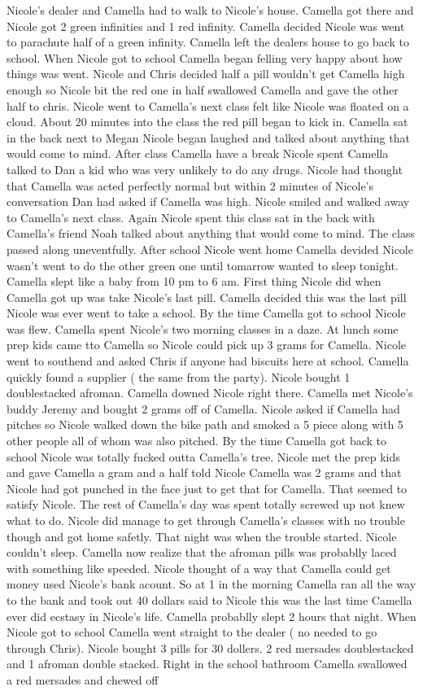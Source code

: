 \documentclass[12pt]{book}
\begin{document}
Nicole's dealer and Camella had to walk to Nicole's house. Camella got there and Nicole got 2 green infinities and 1 red infinity. Camella decided Nicole was went to parachute half of a green infinity. Camella left the dealers house to go back to school. When Nicole got to school Camella began felling very happy about how things was went. Nicole and Chris decided half a pill wouldn't get Camella high enough so Nicole bit the red one in half swallowed Camella and gave the other half to chris. Nicole went to Camella's next class felt like Nicole was floated on a cloud. About 20 minutes into the class the red pill began to kick in. Camella sat in the back next to Megan Nicole began laughed and talked about anything that would come to mind. After class Camella have a break Nicole spent Camella talked to Dan a kid who was very unlikely to do any drugs. Nicole had thought that Camella was acted perfectly normal but within 2 minutes of Nicole's conversation Dan had asked if Camella was high. Nicole smiled and walked away to Camella's next class. Again Nicole spent this class sat in the back with Camella's friend Noah talked about anything that would come to mind. The class passed along uneventfully. After school Nicole went home Camella devided Nicole wasn't went to do the other green one until tomarrow wanted to sleep tonight. Camella slept like a baby from 10 pm to 6 am. First thing Nicole did when Camella got up was take Nicole's last pill. Camella decided this was the last pill Nicole was ever went to take a school. By the time Camella got to school Nicole was flew. Camella spent Nicole's two morning classes in a daze. At lunch some prep kids came tto Camella so Nicole could pick up 3 grams for Camella. Nicole went to southend and asked Chris if anyone had biscuits here at school. Camella quickly found a supplier ( the same from the party). Nicole bought 1 doublestacked afroman. Camella downed Nicole right there. Camella met Nicole's buddy Jeremy and bought 2 grams off of Camella. Nicole asked if Camella had pitches so Nicole walked down the bike path and smoked a 5 piece along with 5 other people all of whom was also pitched. By the time Camella got back to school Nicole was totally fucked outta Camella's tree. Nicole met the prep kids and gave Camella a gram and a half told Nicole Camella was 2 grams and that Nicole had got punched in the face just to get that for Camella. That seemed to satisfy Nicole. The rest of Camella's day was spent totally screwed up not knew what to do. Nicole did manage to get through Camella's classes with no trouble though and got home safetly. That night was when the trouble started. Nicole couldn't sleep. Camella now realize that the afroman pills was probablly laced with something like speeded. Nicole thought of a way that Camella could get money used Nicole's bank acount. So at 1 in the morning Camella ran all the way to the bank and took out 40 dollars said to Nicole this was the last time Camella ever did ecstasy in Nicole's life. Camella probablly slept 2 hours that night. When Nicole got to school Camella went straight to the dealer ( no needed to go through Chris). Nicole bought 3 pills for 30 dollers. 2 red mersades doublestacked and 1 afroman double stacked. Right in the school bathroom Camella swallowed a red mersades and chewed off 
\end{document}
